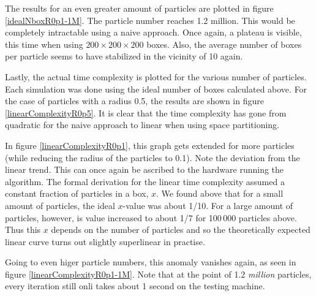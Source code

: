 The results for an even greater amount of particles are plotted in figure 
\ref{idealNboxR0p1-1M}. The particle number reaches 1.2 million. This would 
be completely intractable using a naive approach. Once again, a plateau is 
visible, this time when using $200 \times 200 \times 200$ boxes. Also, the 
average number of boxes per particle seems to have stabilized in the 
vicinity of 10 again.



Lastly, the actual time complexity is plotted for the various number of 
particles. Each simulation was done using the ideal number of boxes 
calculated above. For the case of particles with a radius 0.5, the results 
are shown in figure \ref{linearComplexityR0p5}. It is clear that the time 
complexity has gone from quadratic for the naive approach to linear when 
using space partitioning.




In figure \ref{linearComplexityR0p1}, this graph gets extended for more 
particles (while reducing the radius of the particles to 0.1). Note the 
deviation from the linear trend. This can once again be ascribed to the 
hardware running the algorithm. The formal derivation for the linear time 
complexity assumed a constant fraction of particles in a box, $x$. We found 
above that for a small amount of particles, the ideal $x$-value was about 
1/10. For a large amount of particles, however, is value increased to about 
1/7 for 100\,000 particles above. Thus this $x$ depends on the number of 
particles and so the theoretically expected linear curve turns out slightly 
superlinear in practise.

Going to even higer particle numbers, this anomaly vanishes again, as seen 
in figure \ref{linearComplexityR0p1-1M}. Note that at the point of 1.2 
\emph{million} particles, every iteration still onli takes about 1 second 
on the testing machine.




